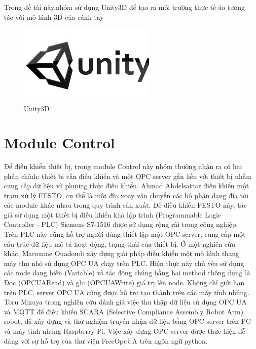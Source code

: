 Trong đề tài này,nhóm sử dụng Unity3D để tạo ra môi trường thực tế ảo tương tác với mô hình 3D của cánh tay
\begin{figure}[!h]
    \centering
    \includegraphics[width=0.6\textwidth]{Images/Implementation/Control/unity.jpg}
    \caption{Unity3D}
\end{figure}

\section{Module Control}

Để điều khiển thiết bị, trong module Control này nhóm thường nhận ra có hai phần chính: thiết bị cần điều khiển và một OPC server gắn liền với thiết bị nhằm cung cấp dữ liệu và phương thức điều khiển. Ahmad Abdelsattar \cite{abdelsattaropcgateway} điều khiển một trạm xử lý FESTO, cụ thể là một đĩa xoay vận chuyển các bộ phận dạng đĩa tới các module khác nhau trong quy trình sản xuất. Để điều khiến FESTO này, tác giả sử dụng một thiết bị điều khiển khả lập trình (Programmable Logic Controller - PLC) Siemens S7-1516 được sử dụng rộng rãi trong công nghiệp. Trên PLC này cũng hỗ trợ người dùng thiết lập một OPC server, cung cấp một cấu trúc dữ liệu mô tả hoạt động, trạng thái của thiết bị. Ở một nghiên cứu khác, Marouane Ouadoudi \cite{elevator} xây dựng giải pháp điều khiển một mô hình thang máy thu nhỏ sử dụng OPC UA chạy trên PLC. Hiện thực này chủ yếu sử dụng các node dạng biến (Variable) và tác động chúng bằng hai method thông dụng là Đọc (OPCUARead) và ghi (OPCUAWrite) giá trị lên node. Không chỉ giới hạn trên PLC, server OPC UA cũng được hỗ trợ tạo thành trên các máy tính nhúng. Toru Mizuya \cite{opcuaMqttmizuya} trong nghiên cứu đánh giá việc thu thập dữ liệu sử dụng OPC UA và MQTT để điều khiển SCARA (Selective Compliance Assembly Robot Arm) robot, đã xây dựng và thử nghiệm truyền nhận dữ liệu bằng OPC server trên PC và máy tính nhúng Raspberry Pi. Việc xây dựng OPC server được thực hiện dễ dàng với sự hỗ trợ của thư viện FreeOpcUA trên ngôn ngữ python.

